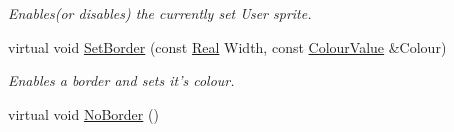 \begin{DoxyCompactItemize}
\begin{DoxyCompactList}\small\item\em Enables(or disables) the currently set User sprite. \item\end{DoxyCompactList}\item 
virtual void \hyperlink{classphys_1_1UI_1_1Button_ac29d118258d105217f3d1f72c634072c}{SetBorder} (const \hyperlink{namespacephys_af7eb897198d265b8e868f45240230d5f}{Real} Width, const \hyperlink{classphys_1_1ColourValue}{ColourValue} \&Colour)
\begin{DoxyCompactList}\small\item\em Enables a border and sets it's colour. \item\end{DoxyCompactList}\item 
\hypertarget{classphys_1_1UI_1_1Button_adaf3f9ed9f8478e180278b71cb355db6}{
virtual void \hyperlink{classphys_1_1UI_1_1Button_adaf3f9ed9f8478e180278b71cb355db6}{NoBorder} ()}
\label{d8/d88/classphys_1_1UI_1_1Button_adaf3f9ed9f8478e180278b71cb355db6}


\end{DoxyCompactItemize}
